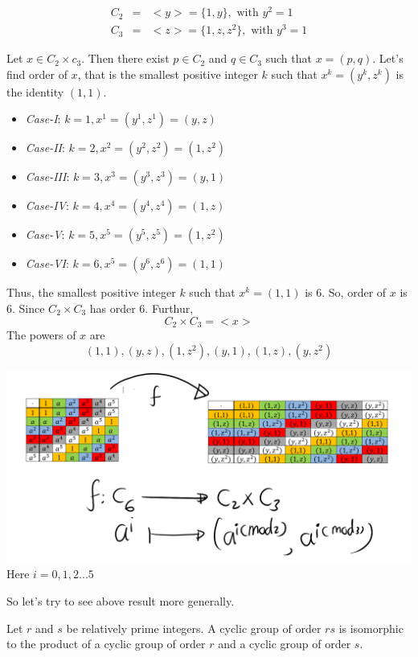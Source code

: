 \documentclass[
]{book}
\providecommand{\tightlist}{%
  \setlength{\itemsep}{0pt}\setlength{\parskip}{0pt}}
\begin{document}
\begin{eqnarray}
C_2&=&<y>=\{1,y\},\text{ with } y^2=1\\
C_3&=&<z>=\{1,z,z^2\}, \text{ with } y^3=1
\end{eqnarray}

Let \(x\in C_2\times c_3\). Then there exist \(p\in C_2\) and
\(q\in C_3\) such that \(x=(p, q)\). Let's find order of \(x\), that is
the smallest positive integer \(k\) such that \(x^k =(y^k,z^k)\) is the
identity \((1, 1)\).

\begin{itemize}
\tightlist
\item
  \emph{Case-I}: \(k=1, x^1=(y^1,z^1)=(y,z)\)
\item
  \emph{Case-II}: \(k=2, x^2=(y^2,z^2)=(1,z^2)\)
\item
  \emph{Case-III}: \(k=3, x^3=(y^3,z^3)=(y,1)\)
\item
  \emph{Case-IV}: \(k=4, x^4=(y^4,z^4)=(1,z)\)
\item
  \emph{Case-V}: \(k=5, x^5=(y^5,z^5)=(1,z^2)\)
\item
  \emph{Case-VI}: \(k=6, x^5=(y^6,z^6)=(1,1)\)
\end{itemize}

Thus, the smallest positive integer \(k\) such that \(x^k=(1, 1)\) is 6.
So, order of \(x\) is \(6\). Since \(C_2\times C_3\) has order \(6\).
Furthur, \[C_2\times C_3 =<x>\] The powers of \(x\) are
\[(1,1),(y,z),(1,z^2),(y,1),(1,z),(y,z^2)\]

\includegraphics{figures/ch_2/fig02.png} Here \(i=0,1,2...5\)

So let's try to see above result more generally.

\leavevmode{}%
Let \(r\) and \(s\) be relatively prime integers. A cyclic group of
order \(rs\) is isomorphic to the product of a cyclic group of order
\(r\) and a cyclic group of order \(s\).
\end{document}
